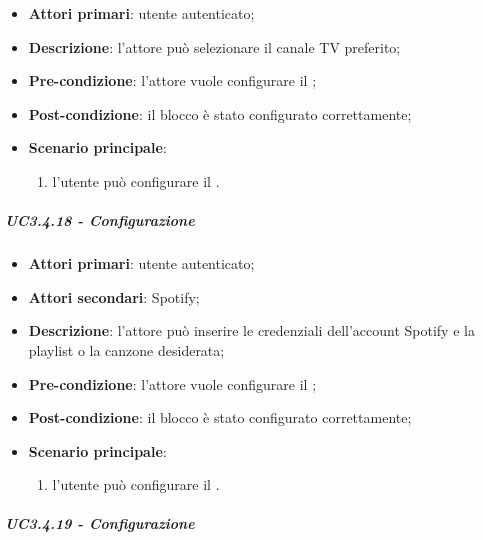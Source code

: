 \begin{itemize}
\item \textbf{Attori primari}: utente autenticato;

\item \textbf{Descrizione}: l'attore può selezionare il canale TV preferito;

\item \textbf{Pre-condizione}: l'attore vuole configurare il \BTV{};

\item \textbf{Post-condizione}:  il blocco è stato configurato correttamente;

\item \textbf{Scenario principale}:
\begin{enumerate}
\item  l'utente può configurare il \BTV{}.

\end{enumerate}
\end{itemize}

\subparagraph{UC3.4.18 - Configurazione \BSpotify{}}

\begin{itemize}
\item \textbf{Attori primari}: utente autenticato;

\item \textbf{Attori secondari}: Spotify;

\item \textbf{Descrizione}: l'attore può inserire le credenziali dell'account Spotify e la playlist o la canzone desiderata;

\item \textbf{Pre-condizione}: l'attore vuole configurare il \BSpotify{};

\item \textbf{Post-condizione}:  il blocco è stato configurato correttamente;

\item \textbf{Scenario principale}:
\begin{enumerate}
\item  l'utente può configurare il \BSpotify{}.

\end{enumerate}
\end{itemize}

\subparagraph{UC3.4.19 - Configurazione \BCinema{}}

